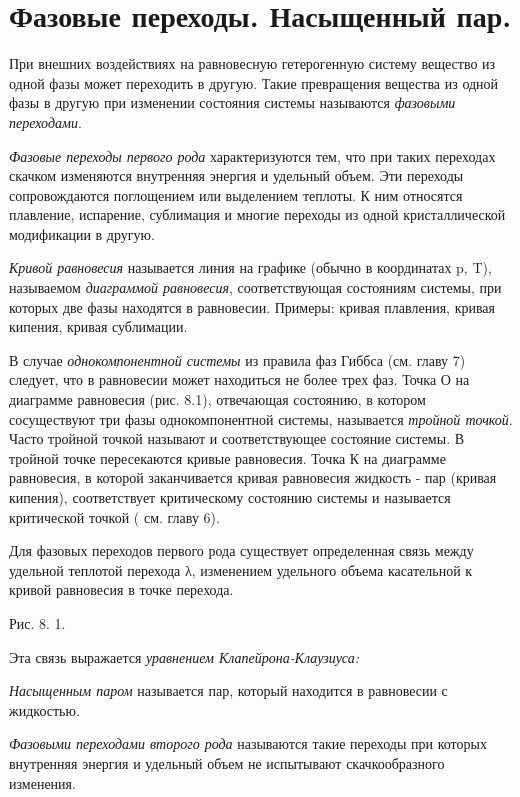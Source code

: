 \chapter{Фазовые переходы. Насыщенный пар.}

При внешних воздействиях на равновесную гетерогенную систему вещество из
одной фазы может переходить в другую. Такие превращения вещества из
одной фазы в другую при изменении состояния системы называются
\emph{фазовыми переходами}.

\emph{Фазовые переходы первого рода} характеризуются тем, что при таких
переходах скачком изменяются внутренняя энергия и удельный объем. Эти
переходы сопровождаются поглощением или выделением теплоты. К ним
относятся плавление, испарение, сублимация и многие переходы из одной
кристаллической модификации в другую.

\emph{Кривой равновесия} называется линия на графике (обычно в
координатах p, T), называемом \emph{диаграммой равновесия},
соответствующая состояниям системы, при которых две фазы находятся в
равновесии. Примеры: кривая плавления, кривая кипения, кривая
сублимации.

В случае \emph{однокомпонентной системы} из правила фаз Гиббса (см.
главу 7) следует, что в равновесии может находиться не более трех фаз.
Точка О на диаграмме равновесия (рис. 8.1), отвечающая состоянию, в
котором сосуществуют три фазы однокомпонентной системы, называется
\emph{тройной точкой}. Часто тройной точкой называют и соответствующее
состояние системы. В тройной точке пересекаются кривые равновесия. Точка
К на диаграмме равновесия, в которой заканчивается кривая равновесия
жидкость - пар (кривая кипения), соответствует критическому состоянию
системы и называется критической точкой ( см. главу 6).

Для фазовых переходов первого рода существует определенная связь между
удельной теплотой перехода λ, изменением удельного объема
касательной к кривой равновесия в точке перехода.


Рис. 8. 1.

Эта связь выражается \emph{уравнением Клапейрона-Клаузиуса:}


\emph{Насыщенным паром} называется пар, который находится в равновесии с
жидкостью.

\emph{Фазовыми переходами второго рода} называются такие переходы при
которых внутренняя энергия и удельный объем не испытывают
скачкообразного изменения.

